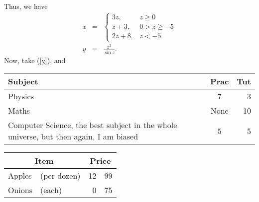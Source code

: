 \documentclass[10pt]{article} %
\begin{document}
Thus, we have
\begin{eqnarray}
x & = & \left\{
	\begin{array}{ll}
	3z, & z\geq 0 \\
	z+3, & 0>z\geq -5 \\
	2z+8, & z<-5 \end{array}
	\right. \nonumber \\
	y & = &
	\frac{z^{2}}{\sin z}.
	\label{y}
	\end{eqnarray}
	Now, take (\ref{y}), and

\begin{tabular}{|p{2.6cm}||c|r|}
\hline
Subject & Prac & Tut \\
\hline\hline
Physics & 7 & 3 \\
\hline
Maths & None & 10 \\
\cline{1-1}\cline{3-3}
Computer Science, the best
subject in the whole universe,
but then again, I am
biased & 5 & 5 \\
\hline
\end{tabular}

\begin{center}
\begin{tabular}{|l|l|r@{.}l|}
\hline
\multicolumn{2}{|c}{Item} &
\multicolumn{2}{|c|}{Price} \\
\hline Apples & (per dozen)
& 12 & 99 \\
Onions & (each) & 0 & 75 \\
\hline
\end{tabular}
\end{center}
\end{document}
